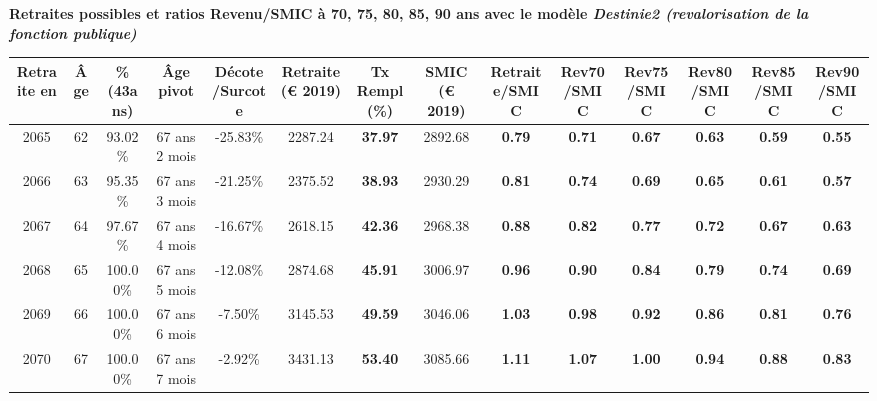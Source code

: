  \vspace{0.1cm} 
{\bf \noindent Retraites possibles et ratios Revenu/SMIC à 70, 75, 80, 85, 90 ans avec le modèle \emph{Destinie2 (revalorisation de la fonction publique)}}  
 
\begin{adjustbox}{max width=\textwidth} 
\begin{tabular}[htb]{|c|c||c|c|c||c|c||c||c|c|c|c|c|c|} 
\hline 
 Retraite en &  Âge &  \%(43ans) &  Âge pivot &  Décote/Surcote &  Retraite (\euro{} 2019) &  Tx Rempl(\%) &  SMIC (\euro{} 2019) &  Retraite/SMIC &  Rev70/SMIC &  Rev75/SMIC &  Rev80/SMIC &  Rev85/SMIC &  Rev90/SMIC \\ 
\hline \hline 
 2065 &  62 &  93.02\% &  67 ans 2 mois &  -25.83\% &  2287.24 &  {\bf 37.97} &  2892.68 &  {\bf {\color{red} 0.79}} &  {\bf {\color{red} 0.71}} &  {\bf {\color{red} 0.67}} &  {\bf {\color{red} 0.63}} &  {\bf {\color{red} 0.59}} &  {\bf {\color{red} 0.55}} \\ 
\hline 
 2066 &  63 &  95.35\% &  67 ans 3 mois &  -21.25\% &  2375.52 &  {\bf 38.93} &  2930.29 &  {\bf {\color{red} 0.81}} &  {\bf {\color{red} 0.74}} &  {\bf {\color{red} 0.69}} &  {\bf {\color{red} 0.65}} &  {\bf {\color{red} 0.61}} &  {\bf {\color{red} 0.57}} \\ 
\hline 
 2067 &  64 &  97.67\% &  67 ans 4 mois &  -16.67\% &  2618.15 &  {\bf 42.36} &  2968.38 &  {\bf {\color{red} 0.88}} &  {\bf {\color{red} 0.82}} &  {\bf {\color{red} 0.77}} &  {\bf {\color{red} 0.72}} &  {\bf {\color{red} 0.67}} &  {\bf {\color{red} 0.63}} \\ 
\hline 
 2068 &  65 &  100.00\% &  67 ans 5 mois &  -12.08\% &  2874.68 &  {\bf 45.91} &  3006.97 &  {\bf {\color{red} 0.96}} &  {\bf {\color{red} 0.90}} &  {\bf {\color{red} 0.84}} &  {\bf {\color{red} 0.79}} &  {\bf {\color{red} 0.74}} &  {\bf {\color{red} 0.69}} \\ 
\hline 
 2069 &  66 &  100.00\% &  67 ans 6 mois &  -7.50\% &  3145.53 &  {\bf 49.59} &  3046.06 &  {\bf 1.03} &  {\bf {\color{red} 0.98}} &  {\bf {\color{red} 0.92}} &  {\bf {\color{red} 0.86}} &  {\bf {\color{red} 0.81}} &  {\bf {\color{red} 0.76}} \\ 
\hline 
 2070 &  67 &  100.00\% &  67 ans 7 mois &  -2.92\% &  3431.13 &  {\bf 53.40} &  3085.66 &  {\bf 1.11} &  {\bf 1.07} &  {\bf 1.00} &  {\bf {\color{red} 0.94}} &  {\bf {\color{red} 0.88}} &  {\bf {\color{red} 0.83}} \\ 
\hline 
\hline 
\end{tabular} 
\end{adjustbox} 
 
